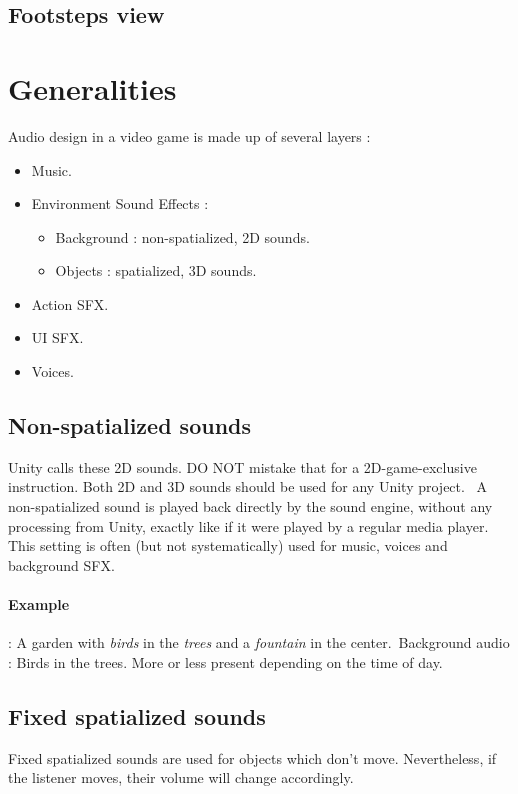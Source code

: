 \documentclass[a4paper,10pt]{article}
\begin{document}
\subsection{Footsteps view}



\section{Generalities} \label{sec:gen}

Audio design in a video game is made up of several layers : \begin{itemize}
\item Music.
\item Environment Sound Effects : 
	\begin{itemize}
	\item Background : non-spatialized, 2D sounds.
	\item Objects : spatialized, 3D sounds.
	\end{itemize}
\item Action SFX.
\item UI SFX.
\item Voices.
\end{itemize}


\subsection{Non-spatialized sounds}
Unity calls these 2D sounds. DO NOT mistake that for a 2D-game-exclusive instruction. Both 2D and 3D sounds should be used for any Unity project. \
A non-spatialized sound is played back directly by the sound engine, without any processing from Unity, exactly like if it were played by a regular media player. This setting is often (but not systematically) used for music, voices and background SFX. \\

\paragraph{Example} : A garden with \emph{birds} in the \emph{trees} and a \emph{fountain} in the center.\
Background audio : Birds in the trees. More or less present depending on the time of day.

\subsection{Fixed spatialized sounds}
Fixed spatialized sounds are used for objects which don't move. Nevertheless, if the listener moves, their volume will change accordingly.
\end{document}
